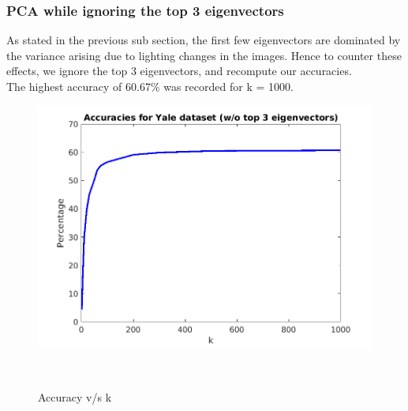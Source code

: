 \documentclass[12pt, a4paper]{article}
\begin{document}
\subsubsection*{PCA while ignoring the top 3 eigenvectors}
\quad As stated in the previous sub section, the first few eigenvectors are dominated by the variance arising due to lighting changes in the images. Hence to counter these effects, we ignore the top 3 eigenvectors, and recompute our accuracies. \\
The highest accuracy of 60.67\% was recorded for k = 1000.
\begin{figure}[h!]
    \centering
    \renewcommand{\thefigure}{4.1}
    \begin{minipage}[c][1\width]{0.4\textwidth}
    	\hspace*{-0.5in}
    	\includegraphics[width=1.34\textwidth]{yale_noptop3.png}
    	\null\vspace*{-28pt}
    	\caption{Accuracy v/s k}
	    \label{fig:4.1}
    \end{minipage} \\
\end{figure}

\newpage
\end{document}

